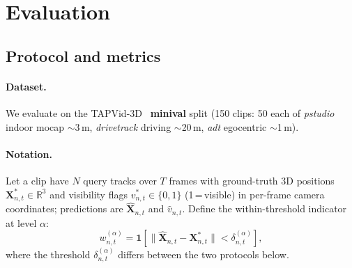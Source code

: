 \documentclass[11pt,a4paper]{article}
\begin{document}
\section{Evaluation}

\subsection{Protocol and metrics}
\label{sec:metrics}

\paragraph{Dataset.}
We evaluate on the TAPVid-3D~\cite{tapvid3d} \textbf{minival} split (150 clips: 50 each of
\emph{pstudio} indoor mocap $\sim$3\,m, \emph{drivetrack} driving $\sim$20\,m, \emph{adt} egocentric
$\sim$1\,m).

\paragraph{Notation.}
Let a clip have $N$ query tracks over $T$ frames with ground-truth 3D positions
$\mathbf{X}^*_{n,t}\!\in\!\mathbb{R}^3$ and visibility flags $v^*_{n,t}\!\in\!\{0,1\}$
(1\,=\,visible) in per-frame camera coordinates; predictions are
$\hat{\mathbf{X}}_{n,t}$ and $\hat{v}_{n,t}$.
Define the within-threshold indicator at level $\alpha$:
\begin{equation}
  w^{(\alpha)}_{n,t}
  = \mathbf{1}\!\left[\lVert\hat{\mathbf{X}}_{n,t}-\mathbf{X}^*_{n,t}\rVert
    < \delta^{(\alpha)}_{n,t}\right],
  \label{eq:within}
\end{equation}
where the threshold $\delta^{(\alpha)}_{n,t}$ differs between the two protocols below.
\end{document}
